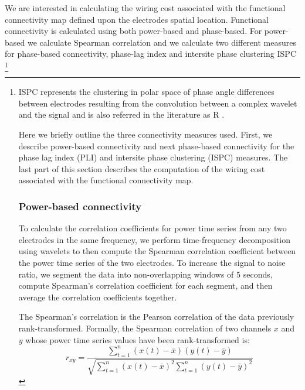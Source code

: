 \documentclass[11pt, onecolumn]{article}
\begin{document}
We are interested in calculating the wiring cost associated with the functional connectivity map defined upon the electrodes spatial location. Functional connectivity is calculated using both power-based and phase-based. For power-based we calculate Spearman correlation and we calculate two different measures for phase-based connectivity, phase-lag index \citep{stam2007phase} and intersite phase clustering ISPC \footnote{ISPC represents the clustering in polar space of phase angle differences between electrodes resulting from the convolution between a complex wavelet and the signal and is also referred in the literature as R \citep{cohen2014analyzing}. 

Here we briefly outline the three connectivity measures used. First, we describe power-based connectivity and next phase-based connectivity for the phase lag index (PLI) and intersite phase clustering (ISPC) measures. The last part of this section describes the computation of the wiring cost associated with the functional connectivity map. 
\subsubsection{Power-based connectivity}
To calculate the correlation coefficients for power time series from any two electrodes in the same frequency, we perform time-frequency decomposition using wavelets to then compute the Spearman correlation coefficient between the power time series of the two electrodes. 
To increase the signal to noise ratio, we segment the data into non-overlapping windows of 5 seconds, compute Spearman's correlation coefficient for each segment, and then average the correlation coefficients together. %

The Spearman's correlation is the Pearson correlation of the data previously rank-transformed. Formally, the Spearman correlation of two channels $x$ and $y$ whose power time series values have been rank-transformed is:
\begin{equation}
r_{xy} = \frac{\sum_{t=1}^{n}(x(t) - \bar{x})(y(t) - \bar{y})}{\sqrt{{\sum_{t=1}^{n}(x(t) - \bar{x})^2}{\sum_{t=1}^{n}(y(t) - \bar{y})^2}}}
\label{eq:pears}
\end{equation}

}
\end{document}
